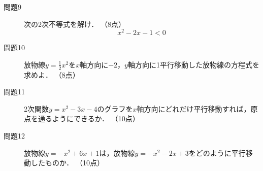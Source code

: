 \documentclass[twocolumn,a4paper,10pt]{ltjsarticle}
\begin{document}
\begin{description}
  \item[問題9]
  次の2次不等式を解け．
  \tiny{（8点）}
  \normalsize
  \begin{equation}
    x^2-2x-1<0 \nonumber
  \end{equation}
\end{description}
\vspace{30mm}

\newpage

\begin{description}
  \item[問題10]
  放物線$y=\frac{1}{2}x^2$を$x$軸方向に$-2$，$y$軸方向に1平行移動した放物線の方程式を
  求めよ．
  \tiny{（8点）}
\end{description}
\vspace{30mm}

\begin{description}
  \item[問題11]
  2次関数$y=x^2-3x-4$のグラフを$x$軸方向にどれだけ平行移動すれば，原点を通るようにできるか．
  \tiny{（10点）}
\end{description}
\vspace{30mm}

\begin{description}
  \item[問題12]
  放物線$y=-x^2+6x+1$は，放物線$y=-x^2-2x+3$をどのように平行移動したものか．
  \tiny{（10点）}
\end{description}
\end{document}
